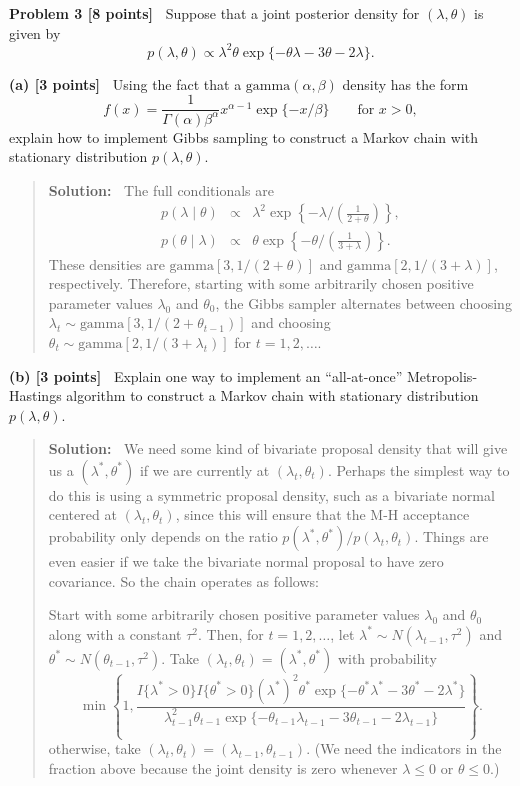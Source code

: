 \documentclass{article}
\newcommand{\svskip}{\vspace{.2in}}
\newcommand{\lvskip}{\vspace{.5in}}
\begin{document}
\lvskip
{\bf Problem 3 [8 points]\ }
Suppose that a joint posterior density for $(\lambda, \theta)$ is
given by
\[
p(\lambda, \theta) \propto
\lambda^2 \theta\exp\{-\theta\lambda - 3\theta - 2\lambda\} .
\]

\svskip
{\bf(a) [3 points]\ }
Using the fact that a $\mbox{gamma}(\alpha, \beta)$ density has the form
\[
f(x) = \frac{1}{\Gamma(\alpha)\beta^\alpha} x^{\alpha-1} \exp\{-x/\beta\}
\qquad \mbox{for $x>0$},
\]
explain how to implement Gibbs sampling to construct a Markov chain 
with stationary distribution $p(\lambda, \theta)$.
\begin{quotation}{\bf Solution:\ }
The full conditionals are
\begin{eqnarray*}
p(\lambda \mid \theta) &\propto& \lambda^2 \exp\left\{-\lambda/\left(\frac{1}{2+\theta}\right) \right\}, \\
p(\theta \mid \lambda) &\propto& \theta \exp\left\{-\theta/\left(\frac{1}{3+\lambda}\right) \right\}.
\end{eqnarray*}
These densities are $\mbox{gamma}[3,1/(2+\theta)]$ and $\mbox{gamma}[2, 1/(3+\lambda)]$,
respectively.  Therefore,
starting with some arbitrarily chosen positive parameter values $\lambda_0$ and
$\theta_0$, the Gibbs sampler alternates between 
choosing $\lambda_t \sim \mbox{gamma}[3, 1/(2+\theta_{t-1})]$ and
choosing $\theta_t \sim \mbox{gamma}[2, 1/(3+\lambda_t)]$ for $t=1, 2, \ldots$.
\end{quotation}

\svskip
{\bf(b) [3 points]\ }
Explain one way to implement an ``all-at-once'' Metropolis-Hastings algorithm
to construct a Markov chain with stationary distribution $p(\lambda, \theta)$.
\begin{quotation}{\bf Solution:\ }
We  need some kind of bivariate proposal density that will give us a $(\lambda^*, \theta^*)$
if we are currently at $(\lambda_t, \theta_t)$.  Perhaps the simplest way to do this is using a 
symmetric proposal density, such as a bivariate normal centered at $(\lambda_t, \theta_t)$,
since this will ensure that the M-H acceptance probability only depends on the ratio
$p(\lambda^*,\theta^*)/p(\lambda_t,\theta_t)$.
Things are even easier if we take the bivariate normal proposal to have zero covariance.
So the chain operates as follows:

Start with some arbitrarily chosen positive parameter values $\lambda_0$ and
$\theta_0$ along with a constant $\tau^2$.  
Then, for $t=1, 2, \ldots$, let $\lambda^*\sim N(\lambda_{t-1}, \tau^2)$ and
$\theta^* \sim N(\theta_{t-1}, \tau^2)$.  Take $(\lambda_t,\theta_t)=(\lambda^*,\theta^*)$
with probability
\[
\min\left\{ 1, \frac{I\{\lambda^*>0\}
I\{\theta^*>0\}(\lambda^*)^2 \theta^*\exp\{-\theta^*\lambda^* - 3\theta^* - 2\lambda^*\}}
{\lambda_{t-1}^2 \theta_{t-1}\exp\{-\theta_{t-1}\lambda_{t-1} - 3\theta_{t-1} - 2\lambda_{t-1}\}} \right\}.
\]
otherwise, take $(\lambda_t,\theta_t)=(\lambda_{t-1},\theta_{t-1})$.
(We need the indicators in the fraction above because the joint density is zero 
whenever $\lambda\le 0$ or $\theta\le0$.)
\end{quotation}
\end{document}
